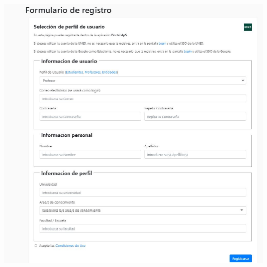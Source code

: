 \documentclass[11pt]{article}
\begin{document}
\includegraphics[width=\textwidth]{registro}
\\\\
\end{document}
